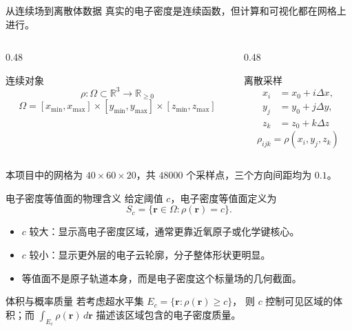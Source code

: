 \documentclass[aspectratio=169,11pt]{ctexbeamer}
\begin{document}
\begin{frame}{从连续场到离散体数据}
  \small
  真实的电子密度是连续函数，但计算和可视化都在网格上进行。

  \begin{columns}
    \begin{column}{0.48\linewidth}
      \begin{block}{连续对象}
        \[
          \rho:\Omega\subset\mathbb R^3\to\mathbb R_{\ge 0}
        \]
        \[
          \Omega=[x_{\min},x_{\max}]
          \times[y_{\min},y_{\max}]
          \times[z_{\min},z_{\max}]
        \]
      \end{block}
    \end{column}
    \begin{column}{0.48\linewidth}
      \begin{block}{离散采样}
        \[
        \begin{aligned}
          x_i&=x_0+i\Delta x,\\
          y_j&=y_0+j\Delta y,\\
          z_k&=z_0+k\Delta z
        \end{aligned}
        \]
        \[
          \rho_{ijk}=\rho(x_i,y_j,z_k)
        \]
      \end{block}
    \end{column}
  \end{columns}

  \vspace{0.6em}
  本项目中的网格为 $40\times 60\times 20$，共 $48000$ 个采样点，三个方向间距均为 $0.1$。
\end{frame}

\begin{frame}{电子密度等值面的物理含义}
  \footnotesize
  给定阈值 $c$，电子密度等值面定义为
  \[
    S_c=\{\mathbf r\in\Omega:\rho(\mathbf r)=c\}.
  \]

  \begin{itemize}
    \item $c$ 较大：显示高电子密度区域，通常更靠近氧原子或化学键核心。
    \item $c$ 较小：显示更外层的电子云轮廓，分子整体形状更明显。
    \item 等值面不是原子轨道本身，而是电子密度这个标量场的几何截面。
  \end{itemize}

  \begin{block}{体积与概率质量}
    若考虑超水平集 $E_c=\{\mathbf r:\rho(\mathbf r)\ge c\}$，
    则 $c$ 控制可见区域的体积；而
    $\int_{E_c}\rho(\mathbf r)\,d\mathbf r$
    描述该区域包含的电子密度质量。
  \end{block}
\end{frame}
\end{document}
